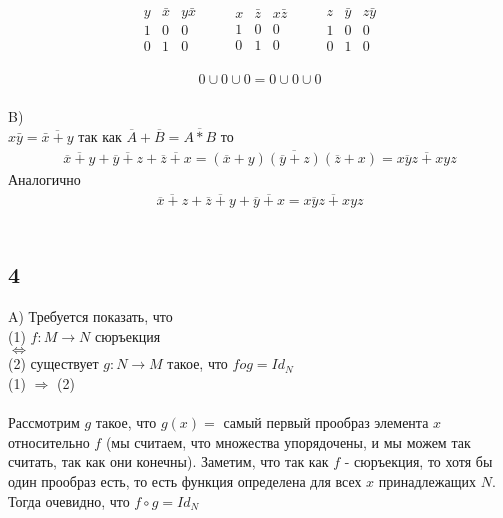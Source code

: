 		\begin{gather*}
			\begin{matrix}
				y & \bar x & y \bar x \\
				1 & 0 & 0 \\
				0 & 1 & 0
			\end{matrix}
		\qquad
			\begin{matrix}
				x & \bar z & x \bar z \\
				1 & 0 & 0 \\
				0 & 1 & 0
			\end{matrix}
		\qquad
			\begin{matrix}
				z & \bar y & z \bar y\\
				1 & 0 & 0 \\
				0 & 1 & 0
			\end{matrix}		
		\end{gather*}				
		
		\begin{gather*}
		0 \cup 0 \cup 0 = 0 \cup 0 \cup 0
		\end{gather*}
		\\
		B)\\
		$x \bar{y} = \overline{\bar{x} + y}$ так как $\overline{A} + \overline{B} = \overline{A * B}$ то 
		\begin{gather*}
			\overline{\overline{x} + y} + \overline{\overline{y} + z} + \overline{\overline{z} + x} = 
			\overline{(\overline{x} + y)(\overline{y} + z)(\overline{z} + x)} = 
			\overline{\overline{xyz} + xyz}
		\end{gather*}
		Аналогично
		\begin{gather*}
		\overline{\overline{x} + z} + \overline{\overline{z} + y} + \overline{\overline{y} + x} = \overline{\overline{xyz} + xyz}
		\end{gather*}
		\\
		
		\subsection{4}
		A)
		Требуется показать, что \\
		(1) $f: M \longrightarrow N$ сюръекция \\
		$\Longleftrightarrow$ \\
		(2) существует $g: N \longrightarrow M$ такое, что $f o g = Id_N$ \\
		
		(1) $\Longrightarrow$ (2) \\ \\
		Рассмотрим $g$ такое, что $g(x) = $ самый первый прообраз элемента $x$ относительно $f$ (мы считаем, что множества упорядочены, и мы можем так считать, так как они конечны). Заметим, что так как $f$ - сюръекция, то хотя бы один прообраз есть, то есть функция определена для всех $x$ принадлежащих $N$. Тогда очевидно, что $f \circ g = Id_N$ \\
		
